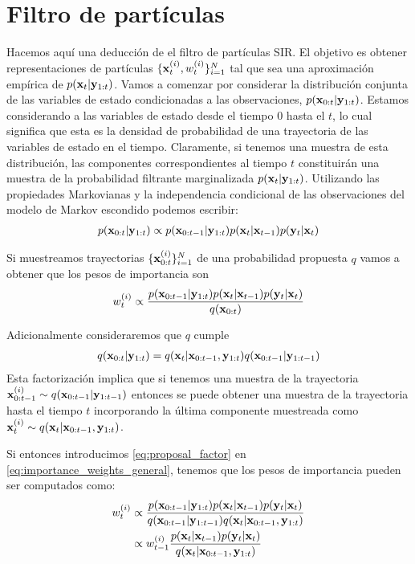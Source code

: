 \section{Filtro de partículas}\label{appendix:pf}

Hacemos aquí una deducción de el filtro de partículas SIR. El objetivo es obtener representaciones de partículas $\{\mathbf{x}_t^{(i)}, w_t^{(i)}\}_{i=1}^{N}$ tal que sea una aproximación empírica de $p(\mathbf{x}_t | \mathbf{y}_{1:t})$. Vamos a comenzar por considerar la distribución conjunta de las variables de estado condicionadas a las observaciones, $p(\mathbf{x}_{0:t} | \mathbf{y}_{1:t})$. Estamos considerando a las variables de estado desde el tiempo $0$ hasta el $t$, lo cual significa que esta es la densidad de probabilidad de una trayectoria de las variables de estado en el tiempo. Claramente, si tenemos una muestra de esta distribución, las componentes correspondientes al tiempo $t$ constituirán una muestra de la probabilidad filtrante marginalizada $p(\mathbf{x}_t | \mathbf{y}_{1:t})$. Utilizando las propiedades Markovianas y la independencia condicional de las observaciones del modelo de Markov escondido podemos escribir:
\begin{align*}
    p(\mathbf{x}_{0:t} | \mathbf{y}_{1:t}) \propto p(\mathbf{x}_{0:t-1} | \mathbf{y}_{1:t}) p(\mathbf{x}_t | \mathbf{x}_{t-1}) p(\mathbf{y}_t | \mathbf{x}_t)
\end{align*}

Si muestreamos trayectorias $\{\mathbf{x}_{0:t}^{(i)}\}_{i=1}^N$ de una probabilidad propuesta $q$ vamos a obtener que los pesos de importancia son 
\begin{align}\label{eq:importance_weights_general}
    w_t^{(i)} \propto \frac{p(\mathbf{x}_{0:t-1} | \mathbf{y}_{1:t}) p(\mathbf{x}_t | \mathbf{x}_{t-1}) p(\mathbf{y}_t | \mathbf{x}_t)}{q(\mathbf{x}_{0:t})}
\end{align}

Adicionalmente consideraremos que $q$ cumple 
\begin{align}\label{eq:proposal_factor}
    q(\mathbf{x}_{0:t} | \mathbf{y}_{1:t}) = q(\mathbf{x}_t | \mathbf{x}_{0:t-1}, \mathbf{y}_{1:t}) q(\mathbf{x}_{0:t-1} | \mathbf{y}_{1:t-1})
\end{align}
Esta factorización implica que si tenemos una muestra de la trayectoria $\mathbf{x}_{0:t-1}^{(i)} \sim q(\mathbf{x}_{0:t-1} | \mathbf{y}_{1:t-1})$ entonces se puede obtener una muestra de la trayectoria hasta el tiempo $t$ incorporando la última componente muestreada como $\mathbf{x}_t^{(i)} \sim q(\mathbf{x}_t | \mathbf{x}_{0:t-1}, \mathbf{y}_{1:t})$.

Si entonces introducimos \ref{eq:proposal_factor} en \ref{eq:importance_weights_general}, tenemos que los pesos de importancia pueden ser computados como:
\begin{align*}
    w_t^{(i)} &\propto \frac{p(\mathbf{x}_{0:t-1} | \mathbf{y}_{1:t}) p(\mathbf{x}_t | \mathbf{x}_{t-1}) p(\mathbf{y}_t | \mathbf{x}_t)}{q(\mathbf{x}_{0:t-1} | \mathbf{y}_{1:t-1}) q(\mathbf{x}_t | \mathbf{x}_{0:t-1},  \mathbf{y}_{1:t})} \\
    &\propto w_{t-1}^{(i)} \frac{p(\mathbf{x}_t | \mathbf{x}_{t-1}) p(\mathbf{y}_t | \mathbf{x}_t)}{q(\mathbf{x}_t | \mathbf{x}_{0:t-1},  \mathbf{y}_{1:t})}
\end{align*}


